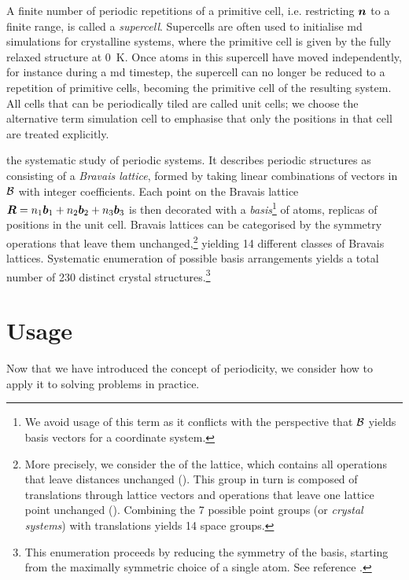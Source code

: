 A finite number of periodic repetitions of a primitive cell, i.e. restricting $\boldsymbol{n}$ to a finite range, is called a \emph{supercell}. Supercells are often used to initialise \gls{md} simulations for crystalline systems, where the primitive cell is given by the fully relaxed structure at \qty{0}{K}. Once atoms in this  supercell have moved independently, for instance during a \gls{md} timestep, the supercell can no longer be reduced to a repetition of primitive cells, becoming the primitive cell of the resulting system. All cells that can be periodically tiled are called unit cells; we choose the alternative term simulation cell to emphasise that only the positions in that cell are treated explicitly.

 the systematic study of periodic systems. It describes periodic structures as consisting of a \emph{Bravais lattice}, formed by taking linear combinations of vectors in $\mathcal{B}$ with integer coefficients. Each point on the Bravais lattice $\boldsymbol{R} = n_1 \boldsymbol{b}_1 + n_2 \boldsymbol{b}_2 + n_3 \boldsymbol{b}_3$ is then decorated with a \emph{basis}\footnote{We avoid usage of this term as it conflicts with the perspective that $\mathcal{B}$ yields basis vectors for a coordinate system.} of atoms, replicas of positions in the unit cell. Bravais lattices can be categorised by the symmetry operations that leave them unchanged,\footnote{More precisely, we consider the  of the lattice, which contains all operations that leave distances unchanged (). This group in turn is composed of translations through lattice vectors and operations that leave one lattice point unchanged (). Combining the 7 possible point groups (or \emph{crystal systems}) with translations yields 14 space groups.} yielding 14 different classes of Bravais lattices. Systematic enumeration of possible basis arrangements yields a total number of 230 distinct crystal structures.\footnote{This enumeration proceeds by reducing the symmetry of the basis, starting from the maximally symmetric choice of a single atom. See reference \cite[ch.~7]{ashcroft1976}.}

\section{Usage}

Now that we have introduced the concept of periodicity, we consider how to apply it to solving problems in practice. 

